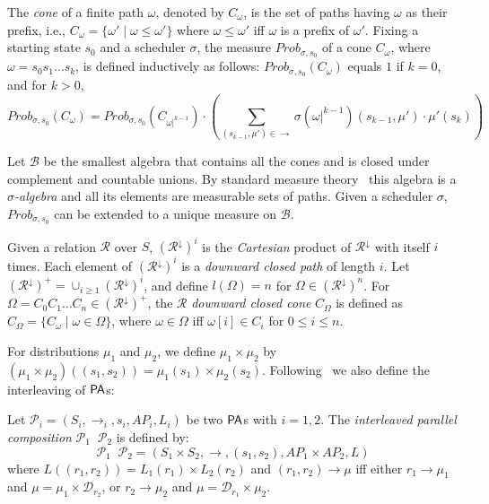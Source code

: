 \documentclass{LMCS}
\DeclareMathOperator{\interleave}{||}
\newcommand{\TRAN}[2]{#1\rightarrow #2}
\newcommand{\AP}{\mathit{AP}}
\newcommand{\PA}{{\sf PA}}
\newcommand{\MC}[1]{\mathcal{#1}}
\newcommand{\DIRAC}[1]{\mathcal{D}_{#1}}
\newcommand{\MEASURE}{\mathit{Prob}}
\newcommand{\DOWNWARD}[2]{#1^{\downarrow}#2}
\begin{document}
The \emph{cone} of a finite path $\omega$, denoted by $C_{\omega}$,
is the set of paths having $\omega$ as their prefix, i.e.,
$C_{\omega}=\{\omega'\mid\omega\leq\omega'\}$ where $\omega\leq\omega'$ iff $\omega$ is a prefix of $\omega'$.
Fixing a starting state $s_0$ and a scheduler $\sigma$, the measure
$\MEASURE_{\sigma,s_0}$ of a cone $C_{\omega}$, where
$\omega=s_0s_1\ldots s_k$, is defined inductively as follows: $\MEASURE_{\sigma,s_0}(C_{\omega})$ equals $1$ if $k=0$, and for $k>0$,
$$
\MEASURE_{\sigma,s_0}(C_{\omega})=\MEASURE_{\sigma,s_0}(C_{\omega|^{k-1}})\cdot\left(\sum\limits_{(s_{k-1},\mu')\in\rightarrow}\sigma(\omega|^{k-1})(s_{k-1},\mu')\cdot\mu'(s_k)\right)
$$

Let $\mathcal{B}$ be the smallest algebra that
contains all the cones and is closed under complement and countable
unions. By standard measure theory~\cite{halmos1974measure,rudin2006real} this algebra is a
$\sigma$\emph{-algebra} and all its elements are
measurable sets of paths. Given a scheduler $\sigma$,
 $\MEASURE_{\sigma,s_0}$ can be extended to a unique
measure on $\mathcal{B}$.


Given a relation $\MC{R}$ over $S$, $(\DOWNWARD{\MC{R}}{})^i$ is the \emph{Cartesian} product of
$\DOWNWARD{\MC{R}}{}$ with itself $i$ times.
Each element of $(\DOWNWARD{\MC{R}}{})^i$  is a \emph{downward closed path} of length $i$.
Let $(\DOWNWARD{\MC{R}}{})^+=\mathop{\cup}_{i\geq
  1}(\DOWNWARD{\MC{R}}{})^i$, and define $l(\Omega)=n$ for $\Omega\in(\DOWNWARD{\MC{R}}{})^n$.
For $\Omega=C_0C_1\ldots C_n\in(\DOWNWARD{\MC{R}}{})^+$, the
$\MC{R}$ \emph{downward closed cone} $C_{\Omega}$ is defined as
$C_{\Omega}=\{C_{\omega}\mid\omega\in\Omega\}$,
where $\omega\in\Omega$ iff $\omega[i]\in C_i$ for $0\leq i\leq n$.


For distributions $\mu_1$ and $\mu_2$, we define $\mu_1\times \mu_2$ by $(\mu_1\times\mu_2)((s_1,s_2))=\mu_1(s_1)\times\mu_2(s_2)$.
Following~\cite{baier2008principles} we also define the interleaving of $\PA$s:
\begin{defi}\label{def:interleave}
Let $\MC{P}_i=(S_i,\rightarrow_i,s_i,\AP_i,L_i)$ be two $\PA$s with $i=1,2$. The \emph{interleaved parallel composition} $\MC{P}_1\interleave\MC{P}_2$ is defined by:
\[\MC{P}_1\interleave\MC{P}_2 = (S_1\times S_2,\rightarrow, (s_1,s_2),\AP_1\times\AP_2,L)\]
where $L((r_1,r_2))=L_1(r_1)\times L_2(r_2)$ and $\TRAN{(r_1,r_2)}{\mu}$ iff either $\TRAN{r_1}{\mu_1}$ and $\mu=\mu_1\times\DIRAC{r_2}$, or $\TRAN{r_2}{\mu_2}$ and $\mu=\DIRAC{r_1}\times\mu_2$.
\end{defi}
\end{document}
